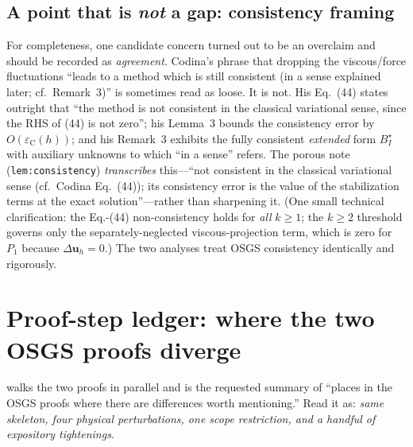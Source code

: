 \documentclass[11pt]{article}
\theoremstyle{remark}
\newcommand{\bu}{\boldsymbol{u}}
\begin{document}
\subsection*{A point that is \emph{not} a gap: consistency framing}

For completeness, one candidate concern turned out to be an overclaim and should be recorded
as \emph{agreement}. Codina's phrase that dropping the viscous/force fluctuations ``leads to a
method which is still consistent (in a sense explained later; cf.\ Remark~3)'' is sometimes read
as loose. It is not. His Eq.~(44) states outright that ``the method is not consistent in the
classical variational sense, since the RHS of (44) is not zero''; his Lemma~3 bounds the
consistency error by $O(\varepsilon_{\mathrm C}(h))$; and his Remark~3 exhibits the fully
consistent \emph{extended} form $B^\star_I$ with auxiliary unknowns to which ``in a sense''
refers. The porous note (\texttt{lem:consistency}) \emph{transcribes} this---``not consistent
in the classical variational sense (cf.\ Codina Eq.~(44)); its consistency error is the value
of the stabilization terms at the exact solution''---rather than sharpening it. (One small
technical clarification: the Eq.-(44) non-consistency holds for \emph{all} $k\ge1$; the $k\ge2$
threshold governs only the separately-neglected viscous-projection term, which is zero for
$P_1$ because $\Delta\bu_h=0$.) The two analyses treat OSGS consistency identically and
rigorously.

\section{Proof-step ledger: where the two OSGS proofs diverge}
\label{sec:ledger}

 walks the two proofs in parallel and is the requested summary of ``places
in the OSGS proofs where there are differences worth mentioning.'' Read it as: \emph{same
skeleton, four physical perturbations, one scope restriction, and a handful of expository
tightenings}.
\end{document}
